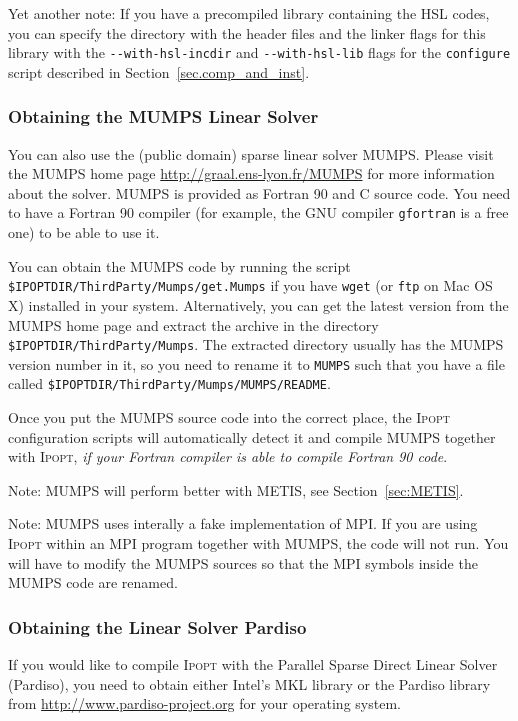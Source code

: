 \documentclass[10pt]{article}
\newcommand{\Ipopt}{\textsc{Ipopt}\xspace}
\begin{document}
Yet another note: If you have a precompiled library containing the
HSL codes, you can specify the directory with the header files and
the linker flags for this library with the \verb|--with-hsl-incdir| and
\verb|--with-hsl-lib| flags for the {\tt configure} script described in
Section~\ref{sec.comp_and_inst}.

\subsubsection{Obtaining the MUMPS Linear Solver}\label{sec:MUMPS}

You can also use the (public domain) sparse linear solver MUMPS.
Please visit the MUMPS home page \url{http://graal.ens-lyon.fr/MUMPS}
for more information about the solver. MUMPS is provided as Fortran 90
and C source code.  You need to have a Fortran 90 compiler (for
example, the GNU compiler {\tt gfortran} is a free one) to be able to
use it.

You can obtain the MUMPS code by running the script
{\tt \$IPOPTDIR/ThirdParty/Mumps/get.Mumps} if you have {\tt wget} 
(or {\tt ftp} on Mac OS X) installed in your system. 
Alternatively, you can get the latest version
from the MUMPS home page and extract the archive in the
directory {\tt \$IPOPTDIR/ThirdParty/Mumps}.  The extracted
directory usually has the MUMPS version number in it, so you need to
rename it to {\tt MUMPS} such that you have a file called
{\tt \$IPOPTDIR/ThirdParty/Mumps/MUMPS/README}.

Once you put the MUMPS source code into the correct place, the \Ipopt
configuration scripts will automatically detect it and compile MUMPS
together with \Ipopt, \emph{if your Fortran compiler is able to compile
Fortran 90 code}.

Note: MUMPS will perform better with METIS, see
Section~\ref{sec:METIS}.

Note: MUMPS uses interally a fake implementation of MPI.  If you are
using \Ipopt within an MPI program together with MUMPS, the code will
not run.  You will have to modify the MUMPS sources so that the MPI
symbols inside the MUMPS code are renamed.

\subsubsection{Obtaining the Linear Solver Pardiso}\label{sec:Pardiso}

If you would like to compile \Ipopt with the Parallel Sparse Direct
Linear Solver (Pardiso), you need to obtain either Intel's MKL library
or the Pardiso library from \url{http://www.pardiso-project.org} for
your operating system.
\end{document}
